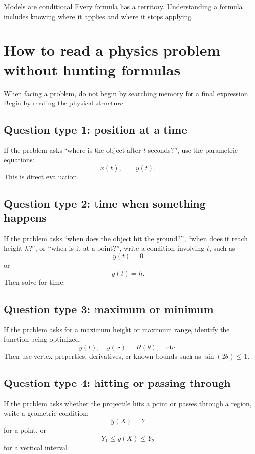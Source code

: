 \documentclass[11pt,a4paper]{article}
\begin{document}
\begin{principlebox}{Models are conditional}
Every formula has a territory. Understanding a formula includes knowing where it applies and where it stops applying.
\end{principlebox}

\section{How to read a physics problem without hunting formulas}

When facing a problem, do not begin by searching memory for a final expression. Begin by reading the physical structure.

\subsection{Question type 1: position at a time}

If the problem asks ``where is the object after $t$ seconds?'', use the parametric equations:
\[
x(t),\qquad y(t).
\]
This is direct evaluation.

\subsection{Question type 2: time when something happens}

If the problem asks ``when does the object hit the ground?'', ``when does it reach height $h$?'', or ``when is it at a point?'', write a condition involving $t$, such as
\[
y(t)=0
\]
or
\[
y(t)=h.
\]
Then solve for time.

\subsection{Question type 3: maximum or minimum}

If the problem asks for a maximum height or maximum range, identify the function being optimized:
\[
y(t),\quad y(x),\quad R(\theta),\quad \text{etc.}
\]
Then use vertex properties, derivatives, or known bounds such as $\sin(2\theta)\le1$.

\subsection{Question type 4: hitting or passing through}

If the problem asks whether the projectile hits a point or passes through a region, write a geometric condition:
\[
y(X)=Y
\]
for a point, or
\[
Y_1\le y(X)\le Y_2
\]
for a vertical interval.
\end{document}
